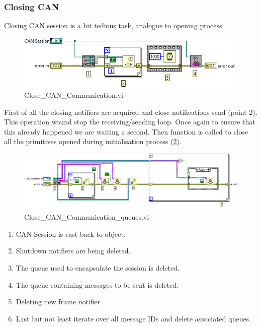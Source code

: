 \subsubsection{Closing CAN}
Closing CAN session is a bit tedious task, analogue to opening process.
\begin{figure}[h]
    \centering
    \includegraphics[width=\textwidth]{figures/Close_CAN_Communicationd}
    \caption{Close\_CAN\_Communication.vi}
    \label{vi:close_can}
\end{figure}
First of all the closing notifiers are acquired and close notifications send (point 2). This operation wound stop the receiving/sending loop. Once again to ensure that this already happened we are waiting a second. Then function is called to close all the primitives opened during initialisation process (\ref{vi:close_can_queues}).
\begin{figure}[h]
    \centering
    \includegraphics[width=\textwidth]{figures/Close_CAN_Communication_queuesd}
    \caption{Close\_CAN\_Communication\_queues.vi}
    \label{vi:close_can_queues}
\end{figure}
\begin{enumerate}
    \itemsep0.1em 
    \item CAN Session is cast back to object.
    \item Shutdown notifiers are being deleted.
    \item The queue used to encapsulate the session is deleted.
    \item The queue containing messages to be sent is deleted.
    \item Deleting new frame notifier
    \item Last but not least iterate over all message IDs and delete associated queues.
\end{enumerate}

